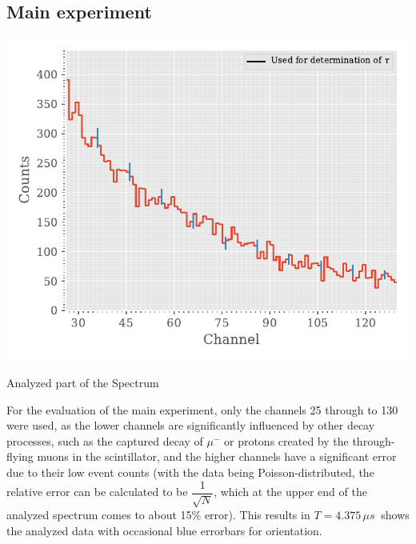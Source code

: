 \documentclass[english,  %
parskip=full,   %
headsepline]{scrartcl}
\newcommand{\mus}{\,\si{\mu s\:}}
\begin{document}
\subsection{Main experiment}
\begin{floatingfigure}{0.5\linewidth}
    \centering
    \includegraphics[width=0.5\linewidth]{spectrum_used.pdf}
    \caption{Analyzed part of the Spectrum}
    \label{fig:spec_used}
\end{floatingfigure}
For the evaluation of the main experiment, only the channels 25 through to 130 were used, as the lower channels are significantly influenced by other decay processes, such as the captured decay of $\mu^-$ or protons created by the through-flying muons in the scintillator, and the higher channels have a significant error due to their low event counts (with the data being Poisson-distributed, the relative error can be calculated to be $\dfrac{1}{\sqrt{N}}$, which at the upper end of the analyzed spectrum comes to about 15\% error). This results in $T=4.375\mus$  shows the analyzed data with occasional blue errorbars for orientation.
\end{document}
